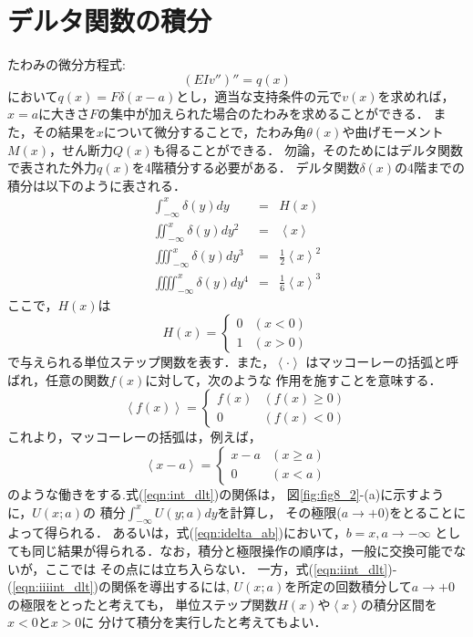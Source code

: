 \documentclass[10pt,a4j]{jarticle}
\begin{document}
\section{デルタ関数の積分}
たわみの微分方程式:
\begin{equation}
	\left(EIv''\right)''=q(x)
\end{equation}
において$q(x)=F\delta(x-a)$とし，適当な支持条件の元で$v(x)$を求めれば，
$x=a$に大きさ$F$の集中が加えられた場合のたわみを求めることができる．
また，その結果を$x$について微分することで，たわみ角$\theta(x)$や曲げモーメント
$M(x)$，せん断力$Q(x)$も得ることができる．
勿論，そのためにはデルタ関数で表された外力$q(x)$を4階積分する必要がある．
デルタ関数$\delta(x)$の4階までの積分は以下のように表される．
\begin{eqnarray}
	\int_{-\infty}^x \delta(y)dy &=& H(x) 
	\label{eqn:int_dlt}
	\\ 
	\iint_{-\infty}^x \delta(y)dy^2 &=& \left< x\right> 
	\label{eqn:iint_dlt}
	\\ 
	\iiint_{-\infty}^x \delta(y)dy^3 &=& \frac{1}{2}\left<x\right>^2
	\label{eqn:iiint_dlt}
	\\ 
	\iiiint_{-\infty}^x \delta(y)dy^4 &=& \frac{1}{6}\left<x\right>^3
	\label{eqn:iiiint_dlt}
\end{eqnarray}
ここで，$H(x)$は
\begin{equation}
	H(x)=\left\{
	\begin{array}{cc}
		0 & (x<0) \\
		1 & (x>0)
	\end{array}
	\right.
\end{equation}
で与えられる単位ステップ関数を表す．また，$\left< \cdot \right>$
はマッコーレーの括弧と呼ばれ，任意の関数$f(x)$に対して，次のような
作用を施すことを意味する．
\begin{equation}
	\left< f(x) \right>=
	\left\{
	\begin{array}{cc}
		f(x) & (f(x) \ge 0) \\
		0 & (f(x) < 0)
	\end{array}
	\right.
\end{equation}
これより，マッコーレーの括弧は，例えば，
\begin{equation}
	\left< x-a \right>=
	\left\{
	\begin{array}{cc}
		x-a & (x \ge a) \\
		0 & (x <a)
	\end{array}
	\right.
\end{equation}
のような働きをする.式(\ref{eqn:int_dlt})の関係は，
図\ref{fig:fig8_2}-(a)に示すように，$U(x;a)$の
積分$\int_{-\infty}^x U(y;a)dy$を計算し，
その極限($a\rightarrow +0$)をとることによって得られる．
あるいは，式(\ref{eqn:idelta_ab})において，$b=x,a\rightarrow -\infty$
としても同じ結果が得られる．なお，積分と極限操作の順序は，一般に交換可能でないが，ここでは
その点には立ち入らない．
一方，式(\ref{eqn:iint_dlt})-(\ref{eqn:iiiint_dlt})の関係を導出するには,
$U(x;a)$を所定の回数積分して$a\rightarrow +0$の極限をとったと考えても，
単位ステップ関数$H(x)$や$\left< x \right>$の積分区間を$x<0$と$x>0$に
分けて積分を実行したと考えてもよい．
\end{document}
